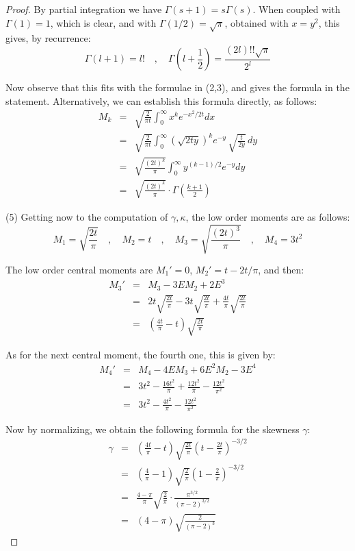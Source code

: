 \documentclass[12pt]{amsbook}
\begin{document}
\begin{proof}
By partial integration we have $\Gamma(s+1)=s\Gamma(s)$. When coupled with $\Gamma(1)=1$, which is clear, and with $\Gamma(1/2)=\sqrt{\pi}$, obtained with $x=y^2$, this gives, by recurrence:
$$\Gamma(l+1)=l!\quad,\quad \Gamma\left(l+\frac{1}{2}\right)=\frac{(2l)!!\sqrt{\pi}}{2^l}$$

Now observe that this fits with the formulae in (2,3), and gives the formula in the statement. Alternatively, we can establish this formula directly, as follows:
\begin{eqnarray*}
M_k
&=&\sqrt{\frac{2}{\pi t}}\int_0^\infty x^ke^{-x^2/2t}dx\\
&=&\sqrt{\frac{2}{\pi t}}\int_0^\infty(\sqrt{2ty})^ke^{-y}\,\sqrt{\frac{t}{2y}}\,dy\\
&=&\sqrt{\frac{(2t)^k}{\pi}}\int_0^\infty y^{(k-1)/2}e^{-y}dy\\
&=&\sqrt{\frac{(2t)^k}{\pi}}\cdot\Gamma\left(\frac{k+1}{2}\right)
\end{eqnarray*}

(5) Getting now to the computation of $\gamma,\kappa$, the low order moments are as follows:
$$M_1=\sqrt{\frac{2t}{\pi}}\quad,\quad M_2=t\quad,\quad 
M_3=\sqrt{\frac{(2t)^3}{\pi}}\quad,\quad M_4=3t^2$$

The low order central moments are $M_1'=0$, $M_2'=t-2t/\pi$, and then:
\begin{eqnarray*}
M_3'
&=&M_3-3EM_2+2E^3\\
&=&2t\sqrt{\frac{2t}{\pi}}-3t\sqrt{\frac{2t}{\pi}}+\frac{4t}{\pi}\sqrt{\frac{2t}{\pi}}\\
&=&\left(\frac{4t}{\pi}-t\right)\sqrt{\frac{2t}{\pi}}
\end{eqnarray*} 

As for the next central moment, the fourth one, this is given by:
\begin{eqnarray*}
M_4'
&=&M_4-4EM_3+6E^2M_2-3E^4\\
&=&3t^2-\frac{16t^2}{\pi}+\frac{12t^2}{\pi}-\frac{12t^2}{\pi^2}\\
&=&3t^2-\frac{4t^2}{\pi}-\frac{12t^2}{\pi^2}
\end{eqnarray*} 

Now by normalizing, we obtain the following formula for the skewness $\gamma$:
\begin{eqnarray*}
\gamma
&=&\left(\frac{4t}{\pi}-t\right)\sqrt{\frac{2t}{\pi}}\left(t-\frac{2t}{\pi}\right)^{-3/2}\\
&=&\left(\frac{4}{\pi}-1\right)\sqrt{\frac{2}{\pi}}\left(1-\frac{2}{\pi}\right)^{-3/2}\\
&=&\frac{4-\pi}{\pi}\sqrt{\frac{2}{\pi}}\cdot\frac{\pi^{3/2}}{(\pi-2)^{3/2}}\\
&=&(4-\pi)\sqrt{\frac{2}{(\pi-2)^3}}
\end{eqnarray*}


\end{proof}
\end{document}

